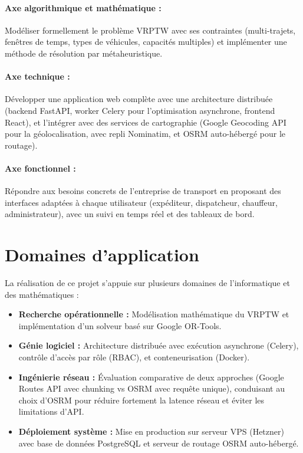 \documentclass[12pt,a4paper]{report}
\begin{document}
\paragraph{Axe algorithmique et mathématique :} Modéliser formellement le problème VRPTW avec ses contraintes (multi-trajets, fenêtres de temps, types de véhicules, capacités multiples) et implémenter une méthode de résolution par métaheuristique.

\paragraph{Axe technique :} Développer une application web complète avec une architecture distribuée (backend FastAPI, worker Celery pour l'optimisation asynchrone, frontend React), et l'intégrer avec des services de cartographie (Google Geocoding API pour la géolocalisation, avec repli Nominatim, et OSRM auto-hébergé pour le routage).

\paragraph{Axe fonctionnel :} Répondre aux besoins concrets de l'entreprise de transport en proposant des interfaces adaptées à chaque utilisateur (expéditeur, dispatcheur, chauffeur, administrateur), avec un suivi en temps réel et des tableaux de bord.

\section*{Domaines d'application}

La réalisation de ce projet s'appuie sur plusieurs domaines de l'informatique et des mathématiques :

\begin{itemize}[leftmargin=2.2em]
    \item \textbf{Recherche opérationnelle :} Modélisation mathématique du VRPTW et implémentation d'un solveur basé sur Google OR-Tools.
    \item \textbf{Génie logiciel :} Architecture distribuée avec exécution asynchrone (Celery), contrôle d'accès par rôle (RBAC), et conteneurisation (Docker).
    \item \textbf{Ingénierie réseau :} Évaluation comparative de deux approches (Google Routes API avec chunking vs OSRM avec requête unique), conduisant au choix d'OSRM pour réduire fortement la latence réseau et éviter les limitations d'API.
    \item \textbf{Déploiement système :} Mise en production sur serveur VPS (Hetzner) avec base de données PostgreSQL et serveur de routage OSRM auto-hébergé.
\end{itemize}
\end{document}
